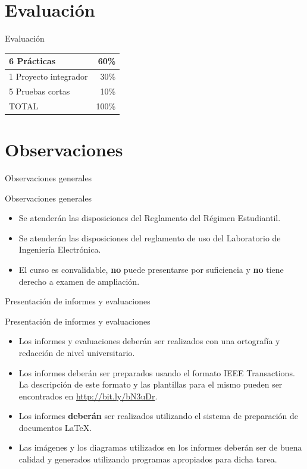 \documentclass[handout,xcolor=dvipsnames]{beamer}
\newcommand{\pageframe}[1]{\frame{\begin{center}{ \Huge #1 }\end{center}}}
\begin{document}
\section{Evaluaci\'on}

\pageframe{Evaluación}

\begin{frame}{Evaluación}
\begin{center}
\begin{tabular}{|l|r|}\hline
	6 Prácticas		&	60\%\\\hline
	1 Proyecto integrador	&	30\%\\\hline
	5 Pruebas cortas	&	10\%\\\hline\hline
	TOTAL			&	100\%\\\hline
\end{tabular}
\end{center}
\end{frame}

\section{Observaciones}

\pageframe{Observaciones}

\begin{frame}{Observaciones generales}
  \begin{block}{Observaciones generales}
    \begin{itemize}[<+->]
      \item Se atenderán las disposiciones del Reglamento del Régimen Estudiantil.
      \item Se atenderán las disposiciones del reglamento de uso del Laboratorio de Ingeniería Electrónica.
      \item El curso es convalidable, \textbf{no} puede presentarse por suficiencia y \textbf{no} tiene derecho a examen de ampliación.
    \end{itemize}
  \end{block}
\end{frame}

\begin{frame}{Presentación de informes y evaluaciones}
\begin{block}{Presentación de informes y evaluaciones}
  \begin{itemize}[<+->]
    \item Los informes y evaluaciones deberán ser realizados con una ortografía y redacción de nivel universitario.
    \item Los informes deberán ser preparados usando el formato IEEE Transactions. La descripción de este formato y las plantillas para el mismo pueden ser encontrados en \url{http://bit.ly/bN3uDr}.
    \item Los informes \textbf{deberán} ser realizados utilizando el sistema de preparación de documentos \LaTeX.
    \item Las imágenes y los diagramas utilizados en los informes deberán ser de buena calidad y generados utilizando programas apropiados para dicha tarea.
  \end{itemize}
\end{block}
\end{frame}
\end{document}
